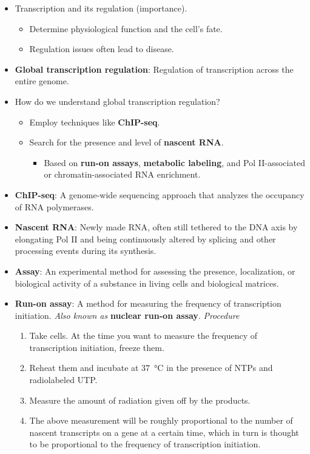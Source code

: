\documentclass[../notes.tex]{subfiles}
\begin{document}
\begin{itemize}
    \item Transcription and its regulation (importance).
    \begin{itemize}
        \item Determine physiological function and the cell's fate.
        \item Regulation issues often lead to disease.
    \end{itemize}
    \item \textbf{Global transcription regulation}: Regulation of transcription across the entire genome.
    \item How do we understand global transcription regulation?
    \begin{itemize}
        \item Employ techniques like \textbf{ChIP-seq}.
        \item Search for the presence and level of \textbf{nascent RNA}.
        \begin{itemize}
            \item Based on \textbf{run-on assays}, \textbf{metabolic labeling}, and Pol II-associated or chromatin-associated RNA enrichment.
        \end{itemize}
    \end{itemize}
    \item \textbf{ChIP-seq}: A genome-wide sequencing approach that analyzes the occupancy of RNA polymerases.
    \item \textbf{Nascent RNA}: Newly made RNA, often still tethered to the DNA axis by elongating Pol II and being continuously altered by splicing and other processing events during its synthesis.
    \item \textbf{Assay}: An experimental method for assessing the presence, localization, or biological activity of a substance in living cells and biological matrices.
    \item \textbf{Run-on assay}: A method for measuring the frequency of transcription initiation. \emph{Also known as} \textbf{nuclear run-on assay}. \emph{Procedure}
    \begin{enumerate}
        \item Take cells. At the time you want to measure the frequency of transcription initiation, freeze them.
        \item Reheat them and incubate at \SI{37}{\celsius} in the presence of NTPs and radiolabeled UTP.
        \item Measure the amount of radiation given off by the products.
        \item The above measurement will be roughly proportional to the number of nascent transcripts on a gene at a certain time, which in turn is thought to be proportional to the frequency of transcription initiation.

\end{enumerate}
\end{itemize}
\end{document}
